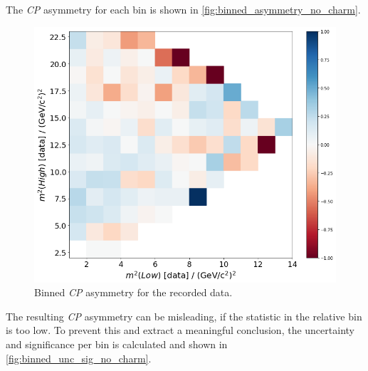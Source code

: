 The \textit{CP} asymmetry for each bin is shown in \autoref{fig:binned_asymmetry_no_charm}. 
\begin{figure}
  \centering
  \includegraphics[width = .45\textwidth]{"content/pics/binned_asymmetry_no_charm.png"}
  \caption{Binned \textit{CP} asymmetry for the recorded data.}
  \label{fig:binned_asymmetry_no_charm}
\end{figure}
The resulting \textit{CP} asymmetry can be misleading, if the statistic in the relative bin is too low. To prevent this and extract a meaningful conclusion, the uncertainty and significance per bin is calculated and shown in \autoref{fig:binned_unc_sig_no_charm}.
